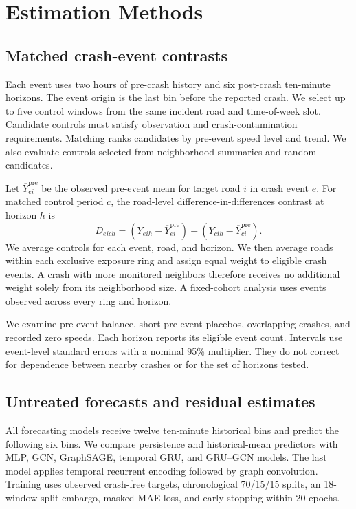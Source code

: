 \documentclass[sigconf,nonacm]{acmart}
\begin{document}
\section{Estimation Methods}
\subsection{Matched crash-event contrasts}
Each event uses two hours of pre-crash history and six post-crash ten-minute horizons. The event origin is the last bin before the reported crash. We select up to five control windows from the same incident road and time-of-week slot. Candidate controls must satisfy observation and crash-contamination requirements. Matching ranks candidates by pre-event speed level and trend. We also evaluate controls selected from neighborhood summaries and random candidates.

Let $\overline{Y}_{ei}^{\mathrm{pre}}$ be the observed pre-event mean for target road $i$ in crash event $e$. For matched control period $c$, the road-level difference-in-differences contrast at horizon $h$ is
\begin{equation}
D_{eich} = \left(Y_{eih}-\overline{Y}_{ei}^{\mathrm{pre}}\right)
-\left(Y_{cih}-\overline{Y}_{ci}^{\mathrm{pre}}\right).
\label{eq:did}
\end{equation}
We average controls for each event, road, and horizon. We then average roads within each exclusive exposure ring and assign equal weight to eligible crash events. A crash with more monitored neighbors therefore receives no additional weight solely from its neighborhood size. A fixed-cohort analysis uses events observed across every ring and horizon.

We examine pre-event balance, short pre-event placebos, overlapping crashes, and recorded zero speeds. Each horizon reports its eligible event count. Intervals use event-level standard errors with a nominal 95\% multiplier. They do not correct for dependence between nearby crashes or for the set of horizons tested.

\subsection{Untreated forecasts and residual estimates}
All forecasting models receive twelve ten-minute historical bins and predict the following six bins. We compare persistence and historical-mean predictors with MLP, GCN, GraphSAGE, temporal GRU, and GRU--GCN models. The last model applies temporal recurrent encoding followed by graph convolution. Training uses observed crash-free targets, chronological 70/15/15 splits, an 18-window split embargo, masked MAE loss, and early stopping within 20 epochs.
\end{document}
